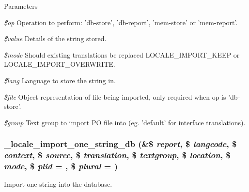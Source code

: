 \begin{DoxyParams}{Parameters}
\item[{\em \$op}]Operation to perform: 'db-\/store', 'db-\/report', 'mem-\/store' or 'mem-\/report'. \item[{\em \$value}]Details of the string stored. \item[{\em \$mode}]Should existing translations be replaced LOCALE\_\-IMPORT\_\-KEEP or LOCALE\_\-IMPORT\_\-OVERWRITE. \item[{\em \$lang}]Language to store the string in. \item[{\em \$file}]Object representation of file being imported, only required when op is 'db-\/store'. \item[{\em \$group}]Text group to import PO file into (eg. 'default' for interface translations). \end{DoxyParams}
\hypertarget{group__locale_ga3f27e3894d1e98f2a0580834ebf51e4e}{
\subsubsection[{\_\-locale\_\-import\_\-one\_\-string\_\-db}]{\setlength{\rightskip}{0pt plus 5cm}\_\-locale\_\-import\_\-one\_\-string\_\-db (\&\$ {\em report}, \/  \$ {\em langcode}, \/  \$ {\em context}, \/  \$ {\em source}, \/  \$ {\em translation}, \/  \$ {\em textgroup}, \/  \$ {\em location}, \/  \$ {\em mode}, \/  \$ {\em plid} = {}, \/  \$ {\em plural} = {})}}
\label{group__locale_ga3f27e3894d1e98f2a0580834ebf51e4e}
Import one string into the database.


